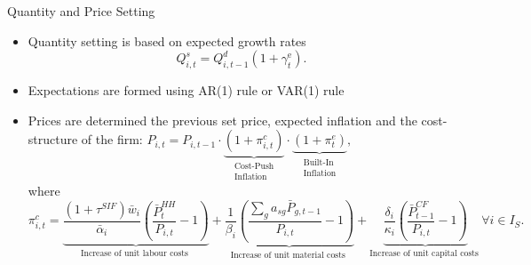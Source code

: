 \documentclass[9pt]{beamer}
\begin{document}
\begin{frame}{Quantity and Price Setting}


    \begin{itemize}
        \item Quantity setting is based on expected growth rates
        \begin{equation}
Q_{i,t}^s = Q_{i,t-1}^d(1+\gamma_t^{\mathrm{e}} ).
\end{equation} 
\item  Expectations are formed using AR(1) rule or VAR(1) rule
\item  Prices are determined the previous set price, expected inflation and the cost-structure of the firm: \footnotesize  $ 
P_{i,t}=P_{i,t-1} \cdot \underbrace{\left(1+\pi_{i,t}^c\right)}_{\begin{array}{c}
\text { Cost-Push } \\
\text { Inflation }
\end{array}} \cdot \underbrace{\left(1+\pi_t^e\right)}_{\begin{array}{c}
\text { Built-In } \\
\text { Inflation }
\end{array}},
$
\\ \normalsize where \footnotesize
\begin{equation}
 \pi_{i,t}^c=\underbrace{\frac{\left(1+\tau^{S I F}\right) \bar{w}_i}{\bar{\alpha}_i}\left(\frac{\bar{P}_t^{H H}}{P_{i,t}}-1\right)}_{\text {Increase of unit labour costs }}+\underbrace{\frac{1}{\beta_i}\left(\frac{\sum_g a_{s g} \bar{P}_{g,t-1}}{P_{i,t}}-1\right)}_{\text {Increase of unit material costs }}+\underbrace{\frac{\delta_i}{\kappa_i}\left(\frac{\bar{P}^{C F}_{t-1}}{P_{i,t}}-1\right)}_{\text {Increase of unit capital costs }} \forall i \in I_S .
\end{equation}
    \end{itemize}
    \normalsize
        \hyperlink{ReturnOverview}{}

\end{frame}
\end{document}
